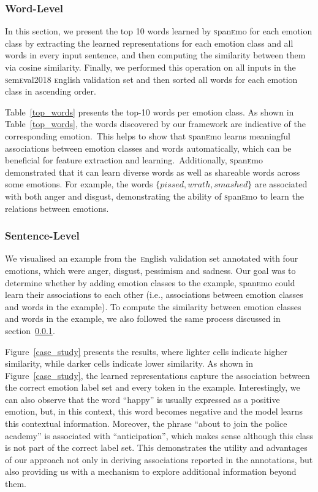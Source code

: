 \documentclass[11pt,a4paper]{article}
\begin{document}
\subsubsection{Word-Level}\label{word_level}


In this section, we present the top 10 words learned by \textsc{s}pan\textsc{e}mo for each emotion class by extracting the learned representations for each emotion class and all words in every input sentence, and then computing the similarity between them via cosine similarity. Finally, we performed this operation on all inputs in the \textsc{s}em\textsc{e}val2018 \textsc{e}nglish validation set and then sorted all words for each emotion class in ascending order. 

Table~\ref{top_words} presents the top-10 words per emotion class. As shown in Table~\ref{top_words}, the words discovered by our framework are indicative of the corresponding emotion.~This helps to show that \textsc{s}pan\textsc{e}mo learns meaningful associations between emotion classes and words automatically, which can be beneficial for feature extraction and learning.~Additionally, \textsc{s}pan\textsc{e}mo demonstrated that it can learn diverse words as well as shareable words across some emotions. For example, the words $\{pissed, wrath, smashed\}$ are associated with both anger and disgust, demonstrating the ability of \textsc{s}pan\textsc{e}mo to learn the relations between emotions. 



\subsubsection{Sentence-Level}We visualised an example from the~\textsc{e}nglish validation set annotated with four emotions, which were anger, disgust, pessimism and sadness. Our goal was to determine whether by adding emotion classes to the example, \textsc{s}pan\textsc{e}mo could learn their associations to each other (i.e., associations between emotion classes and words in the example). To compute the similarity between emotion classes and words in the example, we also followed the same process discussed in section~\ref{word_level}. 

Figure~\ref{case_study} presents the results, where lighter cells indicate higher similarity, while darker cells indicate lower similarity. As shown in Figure~\ref{case_study}, the learned representations capture the association between the correct emotion label set and every token in the example. Interestingly, we can also observe that the word ``happy'' is usually expressed as a positive emotion, but, in this context, this word becomes negative and the model learns this contextual information. Moreover, the phrase ``about to join the police academy'' is associated with ``anticipation'', which makes sense although this class is not part of the correct label set. This demonstrates the utility and advantages of our approach not only in deriving associations reported in the annotations, but also providing us with a mechanism to explore additional information beyond them.  
\end{document}
